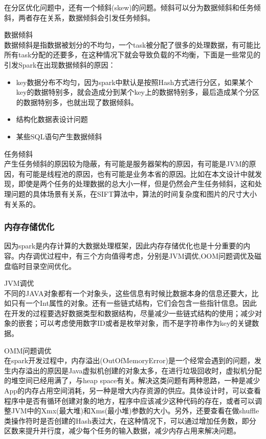 在分区优化问题中，还有一个倾斜(skew)的问题。倾斜可以分为数据倾斜和任务倾斜，两者存在关系，数据倾斜会引发任务倾斜。
\begin{compactenum}
\item 数据倾斜\\数据倾斜是指数据被划分的不均匀，一个task被分配了很多的处理数据，有可能比所有task分配的还要多，在这种情况下就会导致负载的不均衡，下面是一些常见的引发Spark在出现数据倾斜的原因：
\begin{itemize}
\item key数据分布不均匀，因为spark中默认是按照Hash方式进行分区，如果某个key的数据特别多，就会造成分到某个key上的数据特别多，最后造成某个分区的数据特别多，也就出现了数据倾斜。
\item 结构化数据表设计问题
\item 某些SQL语句产生数据倾斜
\end{itemize}

\item 任务倾斜\\产生任务倾斜的原因较为隐蔽，有可能是服务器架构的原因，有可能是JVM的原因，有可能是线程池的原因，也有可能是业务本省的原因。比如在本文设计中就发现，即使是两个任务的处理数据的总大小一样，但是仍然会产生任务倾斜，这和处理问题的具体场景有关系，在SIFT算法中，算法的时间复杂度和图片的尺寸大小有关系的。
\end{compactenum}

\subsubsection{内存存储优化}
因为spark是内存计算的大数据处理框架，因此内存存储优化也是十分重要的内容。内存调优过程中，有三个方向值得考虑，分别是JVM调优,OOM问题调优及磁盘临时目录空间优化。
\begin{compactenum}
\item JVM调优\\不同的JAVA对象都有一个对象头，这些信息有时候比数据本身的信息还要大，比如只有一个Int属性的对象。还有一些链式结构，它们会包含一些指针信息。因此在开发的过程要选好数据类型和数据结构，尽量减少一些链式结构的使用；减少对象的嵌套；可以考虑使用数字ID或者是枚举对象，而不是字符串作为key的关键数据。
\item OMM问题调优\\在spark开发过程中，内存溢出(OutOfMemoryError)是一个经常会遇到的问题，发生内存溢出的原因是Java虚拟机创建的对象太多，在进行垃圾回收时，虚拟机分配的堆空间已经用满了，与heap space有关。解决这类问题有两种思路，一种是减少App的内存占用空间消耗，另一种是增大内存资源的供应。具体设计时，可以查看程序中是否有循环创建对象的地方，程序中应该减少这种代码的存在，或者可以调整JVM中的Xmx(最大堆)和Xms(最小堆)参数的大小。另外，还要查看在做shuffle类操作符时是否创建的Hash表过大，在这种情况下，可以通过增加任务数，即分区数来提升并行度，减少每个任务的输入数据，减少内存占用来解决问题。
\end{compactenum}


